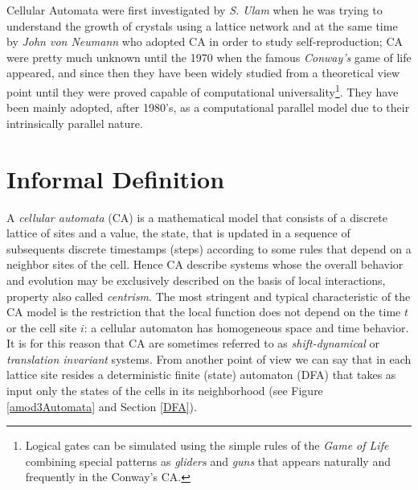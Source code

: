 Cellular Automata were first investigated by \textit{S. Ulam} when he was trying to understand the growth of crystals using a lattice network and at the same time by \textit{John von Neumann} who adopted CA in order to study self-reproduction\cite{Neumann1966}; CA were pretty much unknown until the 1970 when the famous \textit{Conway's} game of life\cite{conway1970} appeared, and since then  they have been widely studied from  a theoretical view point until they were proved capable of computational universality\footnote{Logical gates can be simulated using the simple rules of the \textit{Game of Life} combining special patterns as \textit{gliders} and \textit{guns} that appears naturally and frequently in the Conway's CA.}\cite{Thatcher1970}. They have been mainly adopted, after 1980's, as a computational parallel model due to their intrinsically parallel nature\cite{Margolus1986}.

\section{Informal Definition}

A \emph{cellular automata} (CA) is a mathematical model that
consists of a discrete lattice of sites  and a value, the state, that is
updated in a sequence of subsequents discrete timestamps (steps) according to some  rules that depend on a neighbor sites of the cell. Hence CA describe systems whose the overall behavior and evolution may be exclusively described on the basis of local interactions\cite{wolfram1984}, property also called \textit{centrism}.
The most stringent and typical characteristic of the CA model is the restriction
that the local function does not depend on the time $t$ or the cell site $i$: a cellular automaton has homogeneous space and time behavior. It is for this reason that CA are sometimes referred to as \textit{shift-dynamical} or \textit{translation invariant} systems. From another point of view we can say that in each lattice site resides a  deterministic finite (state) automaton (DFA)\cite{Hopcroft:2006:IAT:1177300} that takes as input only the states of the cells in its neighborhood (see Figure \ref{amod3Automata} and Section \ref{DFA}).

